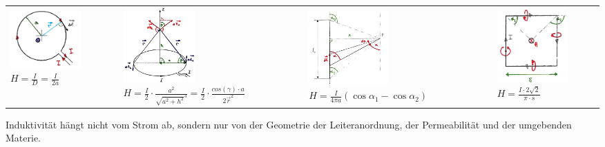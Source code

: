 \renewcommand{\arraystretch}{1}

\begin{tabular}{llll}
	\parbox{4cm}{
		\includegraphics[width=2.7cm]{./bilder/biot1.png} \\
		$H =\frac{I}{D} = \frac{I}{2a}$}
	& \parbox{5cm}{
		\includegraphics[width=2.7cm]{./bilder/biot2.png} \\
		$H=\frac{I}{2} \cdot \frac{a^2}{\sqrt{a^2+h^2}^3} = \frac{I}{2} \cdot 
			\frac{cos(\gamma)\cdot a}{2\vec{r}^2}$}
	& \parbox{4.5cm}{
		\includegraphics[width=3cm]{./bilder/biot3.png} \\
		$H=\frac{I}{4\pi a}(\cos \alpha_1- \cos \alpha_2)$}
	& \parbox{4.5cm}{
		\includegraphics[width=2.7cm]{./bilder/biot4.png} \\
		$H= \frac{I \cdot 2 \sqrt{2}}{\pi \cdot s}$ }
\end{tabular}

Induktivität hängt nicht vom Strom ab, sondern nur von der Geometrie der
Leiteranordnung, der Permeabilität und der umgebenden Materie.

